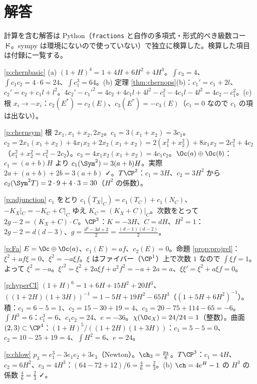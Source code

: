 \section*{解答}
計算を含む解答は Python（\texttt{fractions} と自作の多項式・形式的べき級数コード。sympy は環境にないので使っていない）で独立に検算した。検算した項目は付録に一覧する。
\begin{sol}{\ref{p:chernbasic}}
(a) $(1+H)^4=1+4H+6H^2+4H^3$。$\int c_3=4$、$\int c_1c_2=4\cdot6=24$、$\int c_1^3=64$。(b) 定理 \ref{thm:chernops}(b)：$c_1'=c_1+2l$、$c_2'=c_2+c_1l+l^2$。$4c_2'-c_1'^2=4c_2+4c_1l+4l^2-c_1^2-4c_1l-4l^2=4c_2-c_1^2$。(c) 根 $x_i\to-x_i$：$c_2(E^*)=c_2(E)$、$c_3(E^*)=-c_3(E)$（$c_1=0$ なので $c_1$ の項は出ない）。
\end{sol}
\begin{sol}{\ref{p:chernsym}}
根 $2x_1,x_1+x_2,2x_2$。$c_1=3(x_1+x_2)=3c_1$。$c_2=2x_1(x_1+x_2)+4x_1x_2+2x_2(x_1+x_2)=2(x_1^2+x_2^2)+8x_1x_2=2c_1^2+4c_2$（$x_1^2+x_2^2=c_1^2-2c_2$）。$c_3=4x_1x_2(x_1+x_2)=4c_1c_2$。$\Oc(a)\oplus\Oc(b)$：$c_1=(a+b)H$ より $c_1(\Sym^2)=3(a+b)H$。実際 $2a+(a+b)+2b=3(a+b)$ ✓。$T\CP^2$：$c_1=3H$、$c_2=3H^2$ から $c_2(\Sym^2T)=2\cdot9+4\cdot3=30$（$H^2$ の係数）。
\end{sol}
\begin{sol}{\ref{p:adjunction}}
$c_1$ をとり $c_1(T_X|_C)=c_1(T_C)+c_1(N_C)$、$-K_X|_C=-K_C+C|_C$ ゆえ $K_C=(K_X+C)|_C$。次数をとって $2g-2=(K_X+C)\cdot C$。$\CP^2$：$K=-3H$、$C=dH$、$H^2=1$：$2g-2=d(d-3)$、$g=\frac{d^2-3d+2}2=\frac{(d-1)(d-2)}2$。
\end{sol}
\begin{sol}{\ref{p:Fa}}
$E=\Oc\oplus\Oc(a)$、$c_1(E)=af$、$c_2(E)=0$。命題 \ref{prop:projrel}：$\xi^2+af\xi=0$、$\xi^2=-a\xi f$。$\xi$ はファイバー（$\CP^1$）上で次数 $1$ なので $\int\xi f=1$。よって $\xi^2=-a$。$\xi'^2=\xi^2+2a\xi f+a^2f^2=-a+2a=a$、$\xi\xi'=\xi^2+a\xi f=0$。
\end{sol}
\begin{sol}{\ref{p:hyperCI}}
$(1+H)^6=1+6H+15H^2+20H^3$、$((1+2H)(1+3H))^{-1}=1-5H+19H^2-65H^3$（$(1+5H+6H^2)^{-1}$）。積：$c_1=6-5=1$、$c_2=15-30+19=4$、$c_3=20-75+114-65=-6$。$\int H^3=6$：$c_1^3=6$、$c_1c_2=24$、$e=-36$。$\chi(\Oc_X)=24/24=1$（整数）。曲面 $(2,3)\subset\CP^4$：$(1+H)^5/((1+2H)(1+3H))$：$c_1=5-5=0$、$c_2=10-25+19=4$、$\int H^2=6$、$e=24$。
\end{sol}
\begin{sol}{\ref{p:chlow}}
$p_3=e_1^3-3e_1e_2+3e_3$（Newton）。$\ch_3=\frac{p_3}6$。$T\CP^3$：$c_1=4H$、$c_2=6H^2$、$c_3=4H^3$：$(64-72+12)/6=\frac46=\frac23$。(b) $\ch=4e^H-1$ の $H^3$ の係数 $\frac46=\frac23$ ✓。
\end{sol}
